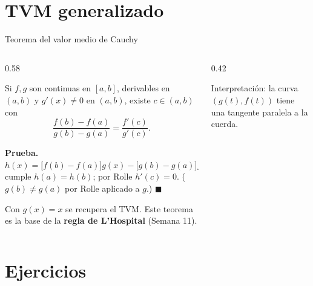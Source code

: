 \documentclass[10pt,aspectratio=169]{beamer}
\begin{document}
\section{TVM generalizado}

\begin{frame}{Teorema del valor medio de Cauchy}
  \begin{columns}
    \begin{column}{0.58\textwidth}
      \begin{teorema}[Cauchy]
        Si $f,g$ son continuas en $[a,b]$, derivables en $(a,b)$ y $g'(x)\ne0$ en $(a,b)$, existe $c\in(a,b)$ con
        \[ \frac{f(b)-f(a)}{g(b)-g(a)}=\frac{f'(c)}{g'(c)}. \]
      \end{teorema}
      \textbf{Prueba.} $h(x)=\big[f(b)-f(a)\big]g(x)-\big[g(b)-g(a)\big]f(x)$ cumple $h(a)=h(b)$; por Rolle $h'(c)=0$. ($g(b)\ne g(a)$ por Rolle aplicado a $g$.) $\blacksquare$
      \begin{observacion}
        Con $g(x)=x$ se recupera el TVM. Este teorema es la base de la \textbf{regla de L'Hospital} (Semana 11).
      \end{observacion}
    \end{column}
    \begin{column}{0.42\textwidth}
      \centering

      \small Interpretación: la curva $(g(t),f(t))$ tiene una tangente paralela a la cuerda.
    \end{column}
  \end{columns}
\end{frame}

\section{Ejercicios}
\end{document}
